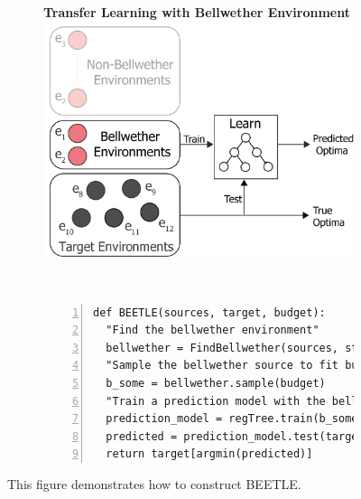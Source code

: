 \begin{figure}[t]
\begin{subfigure}[t]{\linewidth}
\centering
\textbf{Transfer Learning with Bellwether Environment}\\
\includegraphics[width=0.85\linewidth]{figures/bellwether-transfer.png}
\end{subfigure}~~\\
\begin{subfigure}[t]{\linewidth}
\vspace{0.4cm}
\small
\begin{lstlisting}[xleftmargin=5.0ex,mathescape,frame=none,numbers=left]
def BEETLE(sources, target, budget): 
  "Find the bellwether environment"
  bellwether = FindBellwether(sources, step_size, budget, thres, lives)
  "Sample the bellwether source to fit budget"
  b_some = bellwether.sample(budget)
  "Train a prediction model with the bellwether"
  prediction_model = regTree.train(b_some)
  predicted = prediction_model.test(target.indep)
  return target[argmin(predicted)]
\end{lstlisting}
\end{subfigure}	
\caption{{\small This figure demonstrates how to construct BEETLE.}}
\label{fig:approach_b}
\end{figure}



